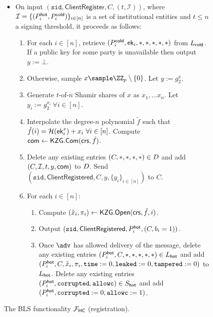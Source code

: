 \begin{figure*}
{{\begin{itemize}
    \item On input $(\texttt{sid},\mathsf{ClientRegister}, C, (t, \mathcal{I}))$, where $\mathcal{I} = \{(P_i^{\mathsf{hot}}, P_i^{\mathsf{cold}})\}_{i \in [n]}$ is a set of institutional entities and $t \leq n$ a signing threshold, it proceeds as follows:
        \begin{enumerate}
        \item For each $i \in [n]$, retrieve $(P_i^{\mathsf{cold}}, \mathsf{ek}_i, *, *, *, *, *)$ from $L_{\mathsf{cold}}$. If a public key for some party is unavailable then output $y := \bot$.
        \item Otherwise, sample $x \sample \ZZ_p \setminus \{0\}$. Let $y := g_2^x$.
        \item Generate $t$-of-$n$ Shamir shares of $x$ as $x_1, \ldots x_n$. Let $y_i := g_2^{x_i} ~\forall i \in [n]$.
        \item Interpolate the degree-$n$ polynomial $\tilde{f}$ such that $\tilde{f}(i) = \mathcal{H}(\mathsf{ek}_i^x) + x_i~\forall i \in [n]$. Compute $\mathsf{com} \gets \mathsf{KZG}.\mathsf{Com}(\mathsf{crs}, \tilde{f})$. %
        \item Delete any existing entries $(C, *, *, *, *) \in D$ and add $(C, \mathcal{I}, t, y, \mathsf{com})$ to $D$. Send $(\texttt{sid},\allowbreak \mathsf{ClientRegistered}, C, y, \{y_i\}_{i \in [n]})$ to $C$.
        \item For each $i \in [n]$:
        \begin{enumerate}
            \item Compute $(\tilde{x}_i, \pi_i) \gets \mathsf{KZG}.\mathsf{Open}(\mathsf{crs}, \tilde{f}, i)$. %
            \item Output $(\texttt{sid},\mathsf{ClientRegistered}, P_i^{\mathsf{hot}}, (C, b_i=1))$.
            \item Once $\adv$ has allowed delivery of the message, delete any existing entries $(P_i^{\mathsf{hot}}, C, *, *, *, *, *) \in L_{\mathsf{hot}}$ and add $(P_i^{\mathsf{hot}}, C,\allowbreak \tilde{x}_i, \pi_i, \texttt{time} := 0, \texttt{leaked} := 0,\allowbreak \texttt{tampered} := 0)$ to $L_{\mathsf{hot}}$. Delete any existing entries $(P_i^{\mathsf{hot}}, \texttt{corrupted}, \texttt{allowc}) \in S_{\mathsf{hot}}$ and add $(P_i^{\mathsf{hot}}, \texttt{corrupted} := 0, \texttt{allowc} := 1)$.
        \end{enumerate}
        \end{enumerate}
    \end{itemize}
    }}
    \caption{The BLS \hcwl functionality $\mathcal{F}_\mathsf{HC}$ (registration).}
        \label{fig:FSign1}
    \end{figure*}